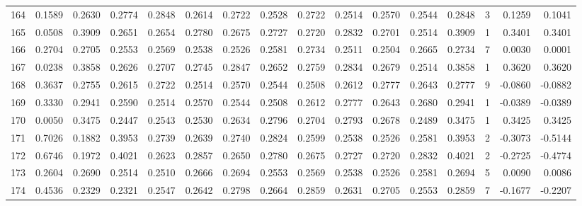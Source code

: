 \begin{tabular}{lrrrrrrrrrrrrrrr}
164 &      0.1589 &  0.2630 &  0.2774 &  0.2848 &  0.2614 &  0.2722 &  0.2528 &  0.2722 &  0.2514 &  0.2570 &   0.2544 &     0.2848 &      3 &                    0.1259 &                     0.1041 \\
165 &      0.0508 &  0.3909 &  0.2651 &  0.2654 &  0.2780 &  0.2675 &  0.2727 &  0.2720 &  0.2832 &  0.2701 &   0.2514 &     0.3909 &      1 &                    0.3401 &                     0.3401 \\
166 &      0.2704 &  0.2705 &  0.2553 &  0.2569 &  0.2538 &  0.2526 &  0.2581 &  0.2734 &  0.2511 &  0.2504 &   0.2665 &     0.2734 &      7 &                    0.0030 &                     0.0001 \\
167 &      0.0238 &  0.3858 &  0.2626 &  0.2707 &  0.2745 &  0.2847 &  0.2652 &  0.2759 &  0.2834 &  0.2679 &   0.2514 &     0.3858 &      1 &                    0.3620 &                     0.3620 \\
168 &      0.3637 &  0.2755 &  0.2615 &  0.2722 &  0.2514 &  0.2570 &  0.2544 &  0.2508 &  0.2612 &  0.2777 &   0.2643 &     0.2777 &      9 &                   -0.0860 &                    -0.0882 \\
169 &      0.3330 &  0.2941 &  0.2590 &  0.2514 &  0.2570 &  0.2544 &  0.2508 &  0.2612 &  0.2777 &  0.2643 &   0.2680 &     0.2941 &      1 &                   -0.0389 &                    -0.0389 \\
170 &      0.0050 &  0.3475 &  0.2447 &  0.2543 &  0.2530 &  0.2634 &  0.2796 &  0.2704 &  0.2793 &  0.2678 &   0.2489 &     0.3475 &      1 &                    0.3425 &                     0.3425 \\
171 &      0.7026 &  0.1882 &  0.3953 &  0.2739 &  0.2639 &  0.2740 &  0.2824 &  0.2599 &  0.2538 &  0.2526 &   0.2581 &     0.3953 &      2 &                   -0.3073 &                    -0.5144 \\
172 &      0.6746 &  0.1972 &  0.4021 &  0.2623 &  0.2857 &  0.2650 &  0.2780 &  0.2675 &  0.2727 &  0.2720 &   0.2832 &     0.4021 &      2 &                   -0.2725 &                    -0.4774 \\
173 &      0.2604 &  0.2690 &  0.2514 &  0.2510 &  0.2666 &  0.2694 &  0.2553 &  0.2569 &  0.2538 &  0.2526 &   0.2581 &     0.2694 &      5 &                    0.0090 &                     0.0086 \\
174 &      0.4536 &  0.2329 &  0.2321 &  0.2547 &  0.2642 &  0.2798 &  0.2664 &  0.2859 &  0.2631 &  0.2705 &   0.2553 &     0.2859 &      7 &                   -0.1677 &                    -0.2207 \\

\end{tabular}
